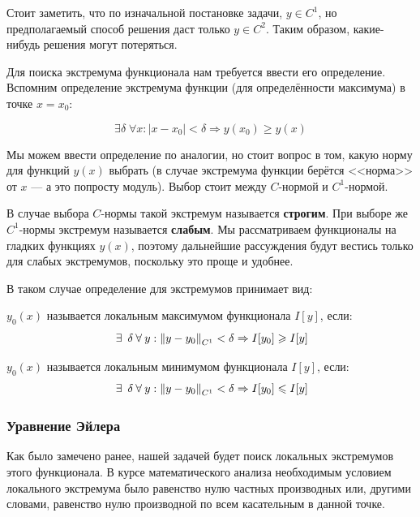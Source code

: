 \documentclass[12pt]{article}
\begin{document}

		Стоит заметить, что по изначальной постановке задачи, $y \in C^1$, но предполагаемый способ решения
		даст только $y \in C^2$. Таким образом, какие-нибудь решения могут потеряться. 

		Для поиска экстремума функционала нам требуется ввести его определение. Вспомним определение 
		экстремума функции (для определённости максимума) в точке $x=x_0$:

			$$\exists \delta \; \forall x: |x - x_0| < \delta \Rightarrow y(x_0) \geq y(x)$$

		Мы можем ввести определение по аналогии, но стоит вопрос в том, какую норму для функций $y(x)$ выбрать
		(в случае экстремума функции берётся <<норма>> от $x$ --- а это попросту модуль). Выбор стоит между 
		$C$-нормой и $C^1$-нормой.

		В случае выбора $C$-нормы такой экстремум называется \textbf{строгим}. При выборе же $C^1$-нормы 
		экстремум называется \textbf{слабым}. Мы рассматриваем функционалы на гладких функциях $y(x)$, 
		поэтому дальнейшие рассуждения будут вестись только для слабых экстремумов, поскольку это проще 
		и удобнее.

		В таком случае определение для экстремумов принимает вид:

		\begin{defi}
			$y_0(x)$ называется локальным максимумом функционала $I[y]$, если:
			$$\exists \; \delta \forall y: \norm{y - y_0}_{C^1} < \delta \Rightarrow I[y_0] \geq I[y]$$
		\end{defi}

		\begin{defi}
			$y_0(x)$ называется локальным минимумом функционала $I[y]$, если:
			$$\exists \; \delta \forall y: \norm{y - y_0}_{C^1} < \delta \Rightarrow I[y_0] \leq I[y]$$
		\end{defi}

	
		\subsubsection{Уравнение Эйлера}
	
			Как было замечено ранее, нашей задачей будет поиск локальных экстремумов этого функционала. В 
			курсе математического анализа необходимым условием локального экстремума было равенство нулю
			частных производных или, другими словами, равенство нулю производной по всем касательным в данной
			точке.
	
\end{document}
